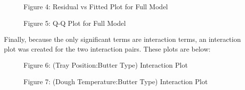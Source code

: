 \documentclass[paper=a4, fontsize=11pt]{scrartcl} %
\numberwithin{equation}{section} %
\numberwithin{figure}{section} %
\numberwithin{table}{section} %
\begin{document}
\begin{figure}[H]
	\caption*{Figure 4: Residual vs Fitted Plot for Full Model}
\end{figure}
\begin{figure}[H]
	\caption*{Figure 5: Q-Q Plot for Full Model}
\end{figure}

Finally, because the only significant terms are interaction terms, an interaction plot was created for the two interaction pairs. These plots are below:

\begin{figure}[H]
	\caption*{Figure 6: (Tray Position:Butter Type) Interaction Plot}
\end{figure}
\begin{figure}[H]
	\caption*{Figure 7: (Dough Temperature:Butter Type) Interaction Plot}
\end{figure}
\end{document}
